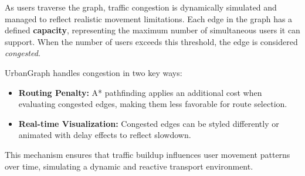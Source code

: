 \documentclass[12pt]{article}
\begin{document}
As users traverse the graph, traffic congestion is dynamically simulated and managed to reflect realistic movement limitations. Each edge in the graph has a defined \textbf{capacity}, representing the maximum number of simultaneous users it can support. When the number of users exceeds this threshold, the edge is considered \textit{congested}.

UrbanGraph handles congestion in two key ways:
\begin{itemize}
    \item \textbf{Routing Penalty:} A* pathfinding applies an additional cost when evaluating congested edges, making them less favorable for route selection.
    \item \textbf{Real-time Visualization:} Congested edges can be styled differently or animated with delay effects to reflect slowdown.
\end{itemize}


This mechanism ensures that traffic buildup influences user movement patterns over time, simulating a dynamic and reactive transport environment.

\vspace{1em}
\end{document}

